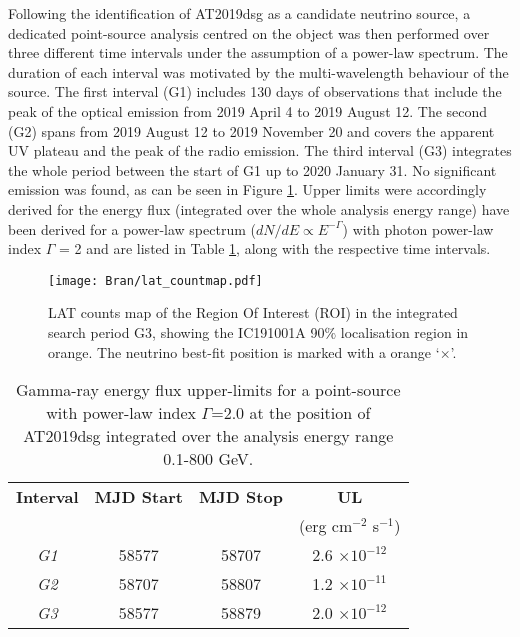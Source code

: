 Following the identification of AT2019dsg as a candidate neutrino source, a dedicated point-source analysis centred on the object was then performed over three different time intervals under the assumption of a power-law spectrum. The duration of each interval was motivated by the multi-wavelength behaviour of the source. The first interval (G1) includes 130 days of observations that include the peak of the optical emission from 2019 April 4 to 2019 August 12. The second (G2) spans from 2019 August 12 to 2019 November 20 and covers the apparent UV plateau and the peak of the radio emission. The third interval (G3) integrates the whole period between the start of G1 up to 2020 January 31. No significant emission was found, as can be seen in Figure \ref{fig:fermi}. Upper limits were accordingly derived for the energy flux (integrated over the whole analysis energy range) have been derived for a power-law spectrum ($dN/dE \propto E^{-\Gamma}$) with photon power-law index $\Gamma$ = 2 and are listed in Table \ref{tab:lat_uls}, along with the respective time intervals.

\begin{figure}
	\centering
	\texttt{[image: Bran/lat\_countmap.pdf]}
	\caption{LAT counts map of the Region Of Interest (ROI) in the integrated search period G3, showing the IC191001A 90$\%$ localisation region in orange. The neutrino best-fit position is marked with a orange `$\times$'. %
	}
	\label{fig:fermi}
\end{figure}

\begin{table}
	\centering
	\begin{tabular}{||c c c c||} 
		\hline
		\textbf{Interval} & \textbf{MJD Start} & \textbf{MJD Stop} & \textbf{UL}\\
		& & &  (erg cm$^{-2}$ s$^{-1}$)\\
		\hline
		\textit{G1} & 58577 & 58707 & 2.6 $\times 10^{-12}$\\
		\textit{G2} & 58707 & 58807 & 1.2 $\times 10^{-11}$\\
		\textit{G3} & 58577 & 58879 & 2.0 $\times 10^{-12}$\\
		\hline
	\end{tabular}
	\caption{Gamma-ray energy flux upper-limits for a point-source with power-law index $\Gamma$=2.0 at the position of AT2019dsg integrated over the analysis energy range 0.1-800 GeV.}
	\label{tab:lat_uls}
\end{table}

